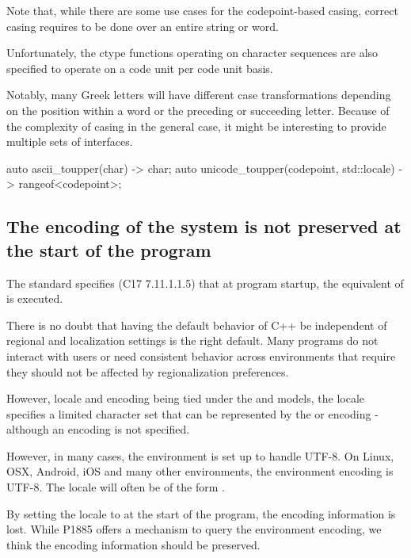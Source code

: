 \documentclass{wg21}
\begin{document}
Note that, while there are some use cases for the codepoint-based casing, correct casing requires to be done over an entire string or word.

Unfortunately, the ctype functions operating on character sequences are also specified to operate on a code unit per code unit basis.  

Notably, many Greek letters will have different case transformations depending on the position within a word or the preceding or succeeding letter.
Because of the complexity of casing in the general case, it might be interesting to provide multiple sets of interfaces.

\begin{codeblock}

auto ascii_toupper(char) -> char;
auto unicode_toupper(codepoint, std::locale) -> rangeof<codepoint>;

\end{codeblock}

\subsection{The encoding of the system is not preserved at the start of the program}

The \cite{C} standard specifies (C17 7.11.1.1.5) that
at program startup, the equivalent of  is executed.

There is no doubt that having the default behavior of C++ be independent of regional and localization settings is the right default.
Many programs do not interact with users or need consistent behavior across environments that require they should not be affected by regionalization preferences.

However, locale and encoding being tied under the  and  models,
the  locale specifies a limited character set that can be represented by the  or  encoding - although an encoding is not specified.

However, in many cases, the environment is set up to handle UTF-8.
On Linux, OSX, Android, iOS and many other environments, the environment encoding is UTF-8. The locale will often be of the form .

By setting the locale to  at the start of the program, the encoding information is lost.
While P1885 \cite{P1885R0} offers a mechanism to query the environment encoding, we think the encoding information should be preserved.
\end{document}

